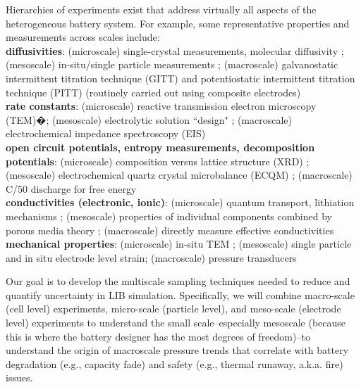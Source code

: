 \documentclass[11pt]{article}
\begin{document}
Hierarchies of experiments exist that address virtually all aspects 
of the heterogeneous battery system.  For example, some representative properties and measurements across scales include:\\
\textbf{diffusivities}: (microscale) single-crystal measurements, molecular diffusivity  \cite{Chung:2011}; (mesoscale) in-situ/single particle measurements \cite{Cui:2012};  (macroscale) galvanostatic intermittent titration technique (GITT) and potentiostatic intermittent titration technique (PITT) (routinely carried out using composite electrodes) \cite{Wen01121979}\\
\textbf{rate constants}: (microscale) reactive transmission electron microscopy (TEM)�\cite{Gu2012}; (mesoscale) electrolytic
solution ``design" \cite{Aurbach2004};  
(macroscale) electrochemical impedance spectroscopy (EIS) \cite{Meyers2000} \\
\textbf{open circuit potentials, entropy measurements, decomposition potentials}:  
(microscale) composition versus lattice structure (XRD) \cite{Ceder2009,Ohzuku1995};
(mesoscale) electrochemical quartz crystal microbalance (ECQM) \cite{Buttry1992};
(macroscale) C/50 discharge for free energy\\
\textbf{conductivities (electronic, ionic)}:  
(microscale) quantum transport, lithiation mechanisms \cite{Ceder2009};
(mesoscale) properties of individual components combined by porous media theory \cite{Stroud1975};
(macroscale) directly measure effective conductivities \\
\textbf{mechanical properties}: 
(microscale) in-situ TEM \cite{Wang:2012};
(mesoscale) single particle and in situ electrode level strain\cite{Qi:2010,Verbrugge:1999};
(macroscale) pressure transducers 

Our goal is to develop the multiscale sampling techniques
needed to reduce and quantify uncertainty in LIB simulation.
Specifically, we will combine
macro-scale (cell level) experiments,
micro-scale (particle level), and meso-scale (electrode level) experiments to
understand the small scale--especially mesoscale (because this is where the
battery designer has the most degrees of freedom)--to 
understand the
origin of macroscale
pressure trends that correlate with battery degradation (e.g.,
capacity fade) and safety (e.g., thermal runaway, a.k.a. fire) issues.
\end{document}
